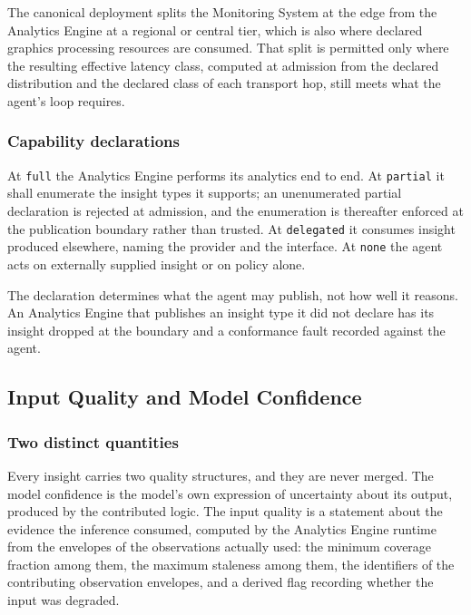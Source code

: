 The canonical deployment splits the Monitoring System at the edge from
the Analytics Engine at a regional or central tier, which is also where
declared graphics processing resources are consumed. That split is
permitted only where the resulting effective latency class, computed at
admission from the declared distribution and the declared class of each
transport hop, still meets what the agent's loop requires.

\hypertarget{capability-declarations-1}{%
\subsubsection{Capability declarations}\label{capability-declarations-1}}

At \texttt{full} the Analytics Engine performs its analytics end to end.
At \texttt{partial} it shall enumerate the insight types it supports; an
unenumerated partial declaration is rejected at admission, and the
enumeration is thereafter enforced at the publication boundary rather
than trusted. At \texttt{delegated} it consumes insight produced
elsewhere, naming the provider and the interface. At \texttt{none} the
agent acts on externally supplied insight or on policy alone.

The declaration determines what the agent may publish, not how well it
reasons. An Analytics Engine that publishes an insight type it did not
declare has its insight dropped at the boundary and a conformance fault
recorded against the agent.

\hypertarget{input-quality-and-model-confidence}{%
\subsection{Input Quality and Model Confidence}\label{input-quality-and-model-confidence}}

\hypertarget{two-distinct-quantities}{%
\subsubsection{Two distinct quantities}\label{two-distinct-quantities}}

Every insight carries two quality structures, and they are never merged.
The model confidence is the model's own expression of uncertainty about
its output, produced by the contributed logic. The input quality is a
statement about the evidence the inference consumed, computed by the
Analytics Engine runtime from the envelopes of the observations actually
used: the minimum coverage fraction among them, the maximum staleness
among them, the identifiers of the contributing observation envelopes,
and a derived flag recording whether the input was degraded.

